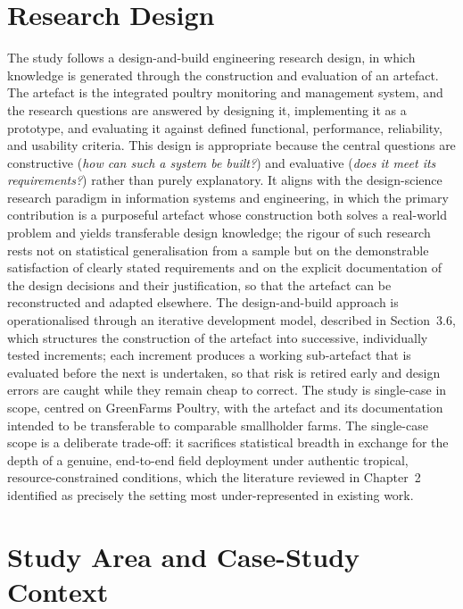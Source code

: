 \documentclass[12pt,a4paper]{report}
\begin{document}
\section{Research Design}

The study follows a design-and-build engineering research design, in which knowledge is generated through the construction and evaluation of an artefact. The artefact is the integrated poultry monitoring and management system, and the research questions are answered by designing it, implementing it as a prototype, and evaluating it against defined functional, performance, reliability, and usability criteria. This design is appropriate because the central questions are constructive (\emph{how can such a system be built?}) and evaluative (\emph{does it meet its requirements?}) rather than purely explanatory. It aligns with the design-science research paradigm in information systems and engineering, in which the primary contribution is a purposeful artefact whose construction both solves a real-world problem and yields transferable design knowledge; the rigour of such research rests not on statistical generalisation from a sample but on the demonstrable satisfaction of clearly stated requirements and on the explicit documentation of the design decisions and their justification, so that the artefact can be reconstructed and adapted elsewhere. The design-and-build approach is operationalised through an iterative development model, described in Section~3.6, which structures the construction of the artefact into successive, individually tested increments; each increment produces a working sub-artefact that is evaluated before the next is undertaken, so that risk is retired early and design errors are caught while they remain cheap to correct. The study is single-case in scope, centred on GreenFarms Poultry, with the artefact and its documentation intended to be transferable to comparable smallholder farms. The single-case scope is a deliberate trade-off: it sacrifices statistical breadth in exchange for the depth of a genuine, end-to-end field deployment under authentic tropical, resource-constrained conditions, which the literature reviewed in Chapter~2 identified as precisely the setting most under-represented in existing work.

\section{Study Area and Case-Study Context}
\end{document}
